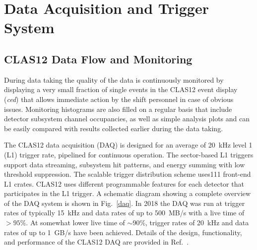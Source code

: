 \documentclass[final,3p,twocolumn]{elsarticle}
\begin{document}
\section{Data Acquisition and Trigger System} 

\subsection {CLAS12 Data Flow and Monitoring} 

During data taking the quality of the data is continuously monitored by displaying a very small fraction of single
events in the CLAS12 event display ({\it ced}) that allows immediate action by the shift personnel in case of obvious
issues. Monitoring histograms are also filled on a regular basis that include detector subsystem channel occupancies,
as well as simple analysis plots and can be easily compared with results collected earlier during the data taking.  

The CLAS12 data acquisition (DAQ) is designed for an average of 20~kHz level 1 (L1) trigger rate, pipelined for
continuous operation. The sector-based  L1 triggers support data streaming, subsystem hit patterns, and energy
summing with low threshold suppression.  The scalable trigger distribution scheme uses111 front-end L1
crates. CLAS12 uses different programmable features for each detector that participates in the L1 trigger. A
schematic diagram showing a complete overview of the DAQ system is shown in Fig.~\ref{daq}. In 2018 the DAQ
was run at trigger rates of typically 15~kHz and data rates of up to 500~MB/s with a live time of $> 95\%$. At
somewhat lower live time of $\sim$90\%, trigger rates of 20~kHz and data rates of up to 1~GB/s have been
achieved. Details of the design, functionality, and performance of the CLAS12 DAQ are provided in Ref.~\cite{DAQ}. 
 
\end{document}
